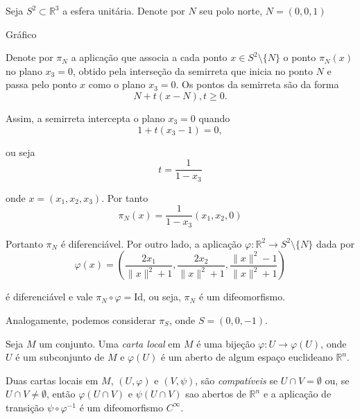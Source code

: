 \begin{exemplo}
Seja $S^2 \subset \mathbb{R}^3$ a esfera unitária. Denote por $N$ seu polo norte, $N = (0,0,1)$

Gráfico

Denote por $\pi_N$ a aplicação que associa a cada ponto $x \in S^2 \setminus \{N\}$ o ponto $\pi_N(x)$ no plano $x_3 = 0$, obtido pela interseção da semirreta que inicia no ponto $N$ e passa pelo ponto $x$ como o plano $x_3 = 0$. Os pontos da semirreta são da forma
\begin{equation*}
    N + t(x - N), t \geq 0.
\end{equation*}

Assim, a semirreta intercepta o plano $x_3 = 0$ quando
\begin{equation*}
    1 + t(x_3 - 1) = 0,
\end{equation*}

ou seja
\begin{equation*}
    t = \frac{1}{1 - x_3}
\end{equation*}

onde $x = (x_1, x_2, x_3)$. Por tanto
\begin{equation*}
    \pi_N(x) = \frac{1}{1-x_3} (x_1, x_2, 0)
\end{equation*}

Portanto $\pi_N$ é diferenciável. Por outro lado, a aplicação $\varphi: \mathbb{R}^2 \rightarrow S^2 \setminus \{N\}$ dada por
\begin{equation*}
	\varphi(x) = \left( \frac{2x_1}{\|x\|^2 + 1}, \frac{2x_2}{\|x\|^2 +1}, \frac{\|x\|^2 -1}{\|x\|^2 +1} \right)
\end{equation*} 

é diferenciável e vale $\pi_N \circ \varphi = \text{Id}$, ou seja, $\pi_N$ é um difeomorfismo.

Analogamente, podemos considerar $\pi_S$, onde $S=(0,0,-1)$.
\end{exemplo}

\begin{defi}
	Seja $M$ um conjunto. Uma \emph{carta local} em $M$ é uma bijeção $\varphi: U \rightarrow \varphi(U)$, onde $U$ é um subconjunto de $M$ e $\varphi(U)$ é um aberto de algum espaço euclideano $\mathbb{R}^n$.
\end{defi}

\begin{defi}
	Duas cartas locais em $M$, $(U, \varphi)$ e $(V, \psi)$, são \emph{compatíveis} se $U \cap V = \emptyset$ ou, se $U \cap V \neq \emptyset$, então $\varphi(U \cap V)$ e $\psi(U \cap V)$ sao abertos de $\mathbb{R}^n$ e a aplicação de transição $\psi \circ \varphi^{-1}$ é um difeomorfismo $C^{\infty}$.
\end{defi}

